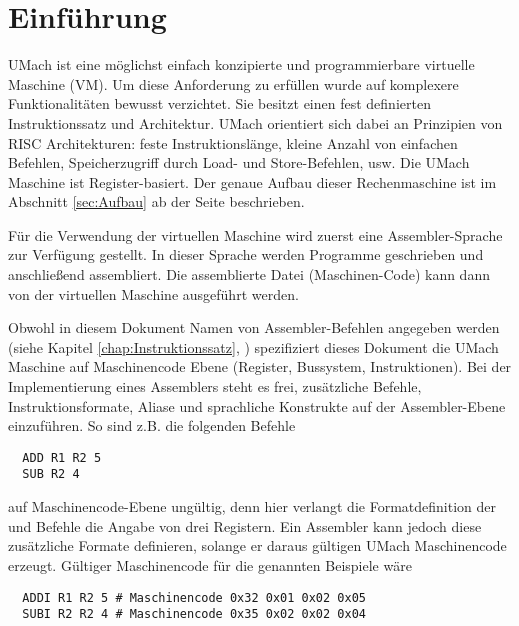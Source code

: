 \chapter{Einführung}

UMach ist eine möglichst einfach konzipierte und programmierbare virtuelle
Maschine (VM). Um diese Anforderung zu erfüllen wurde auf komplexere
Funktionalitäten bewusst verzichtet. Sie besitzt einen fest definierten 
Instruktionssatz und Architektur. UMach orientiert sich dabei an Prinzipien von
RISC Architekturen: feste Instruktionslänge, kleine Anzahl von einfachen
Befehlen, Speicherzugriff durch Load- und Store-Befehlen, usw. Die UMach
Maschine ist Register-basiert. Der genaue Aufbau dieser Rechenmaschine ist im
Abschnitt \ref{sec:Aufbau} ab der Seite \pageref{sec:Aufbau} beschrieben.


Für die Verwendung der virtuellen Maschine wird zuerst eine Assembler-Sprache
zur Verfügung gestellt. In dieser Sprache werden Programme geschrieben und
anschließend assembliert. Die assemblierte Datei (Maschinen-Code) kann dann
von der virtuellen Maschine ausgeführt werden.

Obwohl in diesem Dokument Namen von Assembler-Befehlen angegeben werden (siehe 
Kapitel \ref{chap:Instruktionssatz}, )
spezifiziert dieses Dokument die UMach Maschine auf Maschinencode Ebene
(Register, Bussystem, Instruktionen).
Bei der Implementierung eines Assemblers steht es frei, zusätzliche Befehle,
Instruktionsformate, Aliase und sprachliche Konstrukte auf der Assembler-Ebene
einzuführen. So sind z.B. die folgenden Befehle
\begin{lstlisting}
  ADD R1 R2 5
  SUB R2 4
\end{lstlisting}
auf Maschinencode-Ebene ungültig, denn hier verlangt die Formatdefinition der
 und  Befehle die Angabe von drei Registern. Ein Assembler
kann jedoch diese zusätzliche Formate definieren, solange er daraus
gültigen UMach Maschinencode erzeugt.
Gültiger Maschinencode für die genannten Beispiele wäre
\begin{lstlisting}
  ADDI R1 R2 5 # Maschinencode 0x32 0x01 0x02 0x05
  SUBI R2 R2 4 # Maschinencode 0x35 0x02 0x02 0x04
\end{lstlisting}



